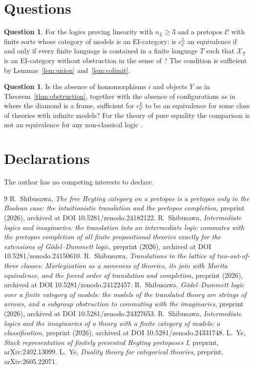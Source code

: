\documentclass[11pt]{amsart}
\theoremstyle{definition}
\newtheorem{que}[thm]{Question}
\newcommand{\cX}{\mathcal X}
\newcommand{\cC}{\mathcal C}
\begin{document}
\section{Questions}

\begin{que}
For the logics proving linearity with $n_L\ge3$ and a pretopos $\cC$
with finite sorts whose category of models is an EI-category: is
$c^L_\cC$ an equivalence if and only if every finite language is
contained in a finite language $T$ such that $\cX_T$ is an
EI-category without obstruction in the sense of
\cite[Thm.~6.15]{Strings}? The condition is sufficient by
Lemmas~\ref{lem:union} and~\ref{lem:colimit}.
\end{que}

\begin{que}
Is the absence of homomorphisms $i$ and objects $Y$ as in
Theorem~\ref{thm:obstruction}, together with the absence of
configurations as in \cite[Prop.~5.1]{Interm} where the diamond is a
frame, sufficient for $c^L_\cC$ to be an equivalence for some class of
theories with infinite models? For the theory of pure equality the comparison is
not an equivalence for any non-classical logic \cite{Interm}.
\end{que}

\section*{Declarations}
The author has no competing interests to declare.

\begin{thebibliography}{9}
 R.~Shibusawa, \emph{The free Heyting category on a
pretopos is a pretopos only in the Boolean case: the intuitionistic
translation and the pretopos completion}, preprint (2026), archived at
DOI 10.5281/zenodo.24182122.
 R.~Shibusawa, \emph{Intermediate logics and
imaginaries: the translation into an intermediate logic commutes with
the pretopos completion of all finite propositional theories exactly
for the extensions of G\"odel--Dummett logic}, preprint (2026),
archived at DOI 10.5281/zenodo.24150610.
 R.~Shibusawa, \emph{Translations in the lattice of
two-out-of-three classes: Morleyization as a sameness of theories, its
join with Morita equivalence, and the forced order of translation and
completion}, preprint (2026), archived at DOI 10.5281/zenodo.24122457.
 R.~Shibusawa, \emph{G\"odel--Dummett logic over a
finite category of models: the models of the translated theory are
strings of arrows, and a subgroup obstruction to commuting with the
imaginaries}, preprint (2026), archived at DOI
10.5281/zenodo.24327653.
 R.~Shibusawa, \emph{Intermediate logics and the
imaginaries of a theory with a finite category of models: a
classification}, preprint (2026), archived at DOI
10.5281/zenodo.24331748.
 L.~Ye, \emph{Stack representation of finitely presented
Heyting pretoposes I}, preprint, arXiv:2402.13099.
 L.~Ye, \emph{Duality theory for categorical theories},
preprint, arXiv:2605.22071.
\end{thebibliography}
\end{document}
